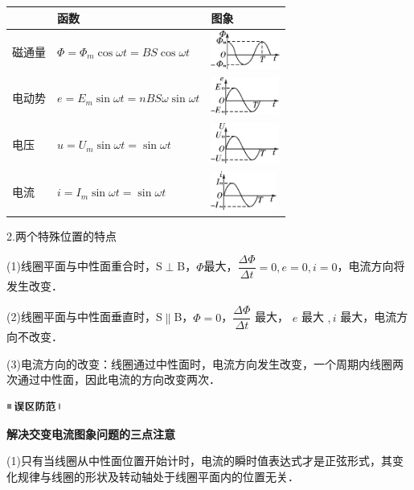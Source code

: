 \documentclass[cn,10.5pt,chinese,mac,chinesefont=founder]{elegantbook}
\begin{document}
\begin{longtable}[]{@{}m{1.5cm}m{5cm}m{3cm}@{}}
\toprule
& 函数 & 图象\tabularnewline
\midrule
\endhead
磁通量 & $\Phi=\Phi_m\cos \omega t=BS\cos  \omega t$ &
\includegraphics[width=0.89653in,height=0.5in]{media/image439.png}\tabularnewline
电动势 & $e=E_m\sin \omega t=nBS\omega\sin \omega t $&
\includegraphics[width=0.87708in,height=0.49028in]{media/image440.png}\tabularnewline
电压 & $u=U_m\sin \omega t=\sin \omega t$ &
\includegraphics[width=0.87708in,height=0.51875in]{media/image441.png}\tabularnewline
电流 & $i=I_m\sin \omega t=\sin \omega t$ &
\includegraphics[width=0.84931in,height=0.5in]{media/image442.png}\tabularnewline
\bottomrule
\end{longtable}

2.两个特殊位置的特点

(1)线圈平面与中性面重合时，S$\perp$B，$\Phi$最大，$\dfrac{\Delta \Phi}{\Delta t}=0, e=0, i=0$，电流方向将发生改变．

(2)线圈平面与中性面垂直时，S$\parallel$B，$\Phi=0$，$\dfrac{\Delta \Phi}{\Delta t}$ 最大， $e$ 最大 $, i$ 最大，电流方向不改变．

(3)电流方向的改变：线圈通过中性面时，电流方向发生改变，一个周期内线圈两次通过中性面，因此电流的方向改变两次．

\begin{center}\includegraphics[width=0.70764in,height=0.12292in]{media/image34.png}\end{center}
\begin{center}
	\textbf{解决交变电流图象问题的三点注意}
\end{center}

(1)只有当线圈从中性面位置开始计时，电流的瞬时值表达式才是正弦形式，其变化规律与线圈的形状及转动轴处于线圈平面内的位置无关．
\end{document}
